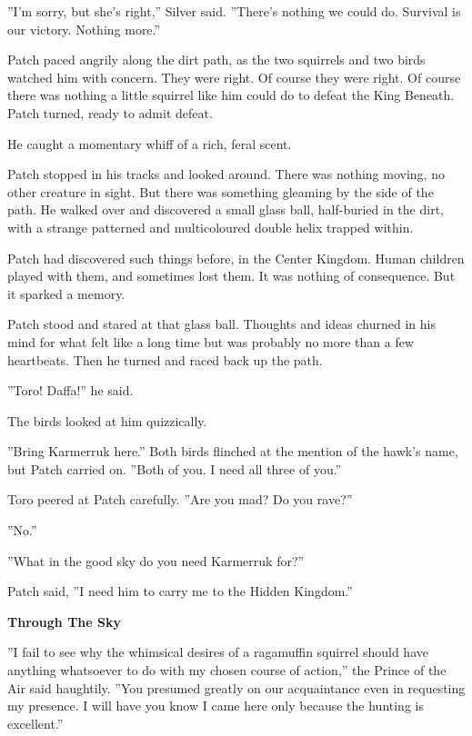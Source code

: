\documentclass[11pt]{article}
\begin{document}
 ''I'm sorry, but she's right,'' Silver said. ''There's nothing we could do. Survival is our victory. Nothing more.''\par
 Patch paced angrily along the dirt path, as the two squirrels and two birds watched him with concern. They were right. Of course they were right. Of course there was nothing a little squirrel like him could do to defeat the King Beneath. Patch turned, ready to admit defeat.\par
He caught a momentary whiff of a rich, feral scent.\par
Patch stopped in his tracks and looked around. There was nothing moving, no other creature in sight. But there was something gleaming by the side of the path. He walked over and discovered a small glass ball, half-buried in the dirt, with a strange patterned and multicoloured double helix trapped within.\par
Patch had discovered such things before, in the Center Kingdom. Human children played with them, and sometimes lost them. It was nothing of consequence. But it sparked a memory.\par
Patch stood and stared at that glass ball. Thoughts and ideas churned in his mind for what felt like a long time but was probably no more than a few heartbeats. Then he turned and raced back up the path.\par
''Toro! Daffa!'' he said.\par
The birds looked at him quizzically.\par
''Bring Karmerruk here.'' Both birds flinched at the mention of the hawk's name, but Patch carried on. ''Both of you. I need all three of you.''\par
Toro peered at Patch carefully. ''Are you mad? Do you rave?''\par
''No.''\par
''What in the good sky do you need Karmerruk for?''\par
Patch said, ''I need him to carry me to the Hidden Kingdom.''\par
\par
{\bf Through The Sky\par
}\par
 ''I fail to see why the whimsical desires of a ragamuffin squirrel should have anything whatsoever to do with my chosen course of action,'' the Prince of the Air said haughtily. ''You presumed greatly on our acquaintance even in requesting my presence. I will have you know I came here only because the hunting is excellent.''\par
\end{document}
